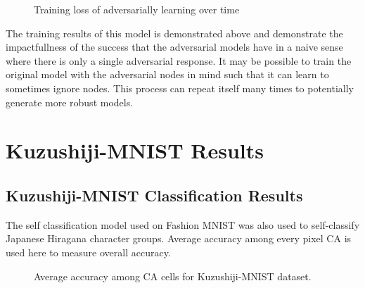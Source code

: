 \documentclass[conference]{IEEEtran}
\begin{document}
\begin{figure}[htbp]
\caption{Training loss of adversarially learning over time}
\end{figure}

The training results of this model is demonstrated above and demonstrate the impactfullness of the success that the adversarial models have in a naive sense where there is only a single adversarial response. It may be possible to train the original model with the adversarial nodes in mind such that it can learn to sometimes ignore nodes. This process can repeat itself many times to potentially generate more robust models.

\section{Kuzushiji-MNIST Results}

\subsection{Kuzushiji-MNIST Classification Results}

The self classification model used on Fashion MNIST was also used to self-classify Japanese Hiragana character groups. Average accuracy among every pixel CA is used here to measure overall accuracy. 

\begin{figure}[htbp]
\caption{Average accuracy among CA cells for Kuzushiji-MNIST dataset.}
\label{kmnistavg}
\end{figure}
\end{document}
